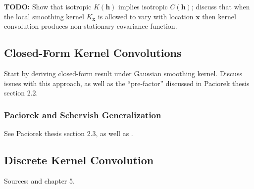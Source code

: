 \documentclass[12pt]{article}
\newcommand{\Ker}{K}
\newcommand{\covFun}{C}
\newcommand{\loc}{\mathbf{x}}
\newcommand{\locLag}{\mathbf{h}}
\begin{document}
\textbf{TODO:} Show that isotropic $\Ker(\locLag)$ implies isotropic $\covFun(\locLag)$; discuss that when the local smoothing kernel $\Ker_{\loc}$ is allowed to vary with location $\loc$
then kernel convolution produces non-stationary covariance function. 

\subsection{Closed-Form Kernel Convolutions}
Start by deriving closed-form result under Gaussian smoothing kernel. Discuss issues with this approach, as well as the ``pre-factor'' discussed in 
Paciorek thesis section 2.2.

\subsubsection{Paciorek and Schervish Generalization}
See Paciorek thesis section 2.3, as well as \cite{Paciorek}. 

\subsection{Discrete Kernel Convolution}
Sources: \cite{Higdon} and \cite{Gramacy} chapter 5. 
\end{document}
